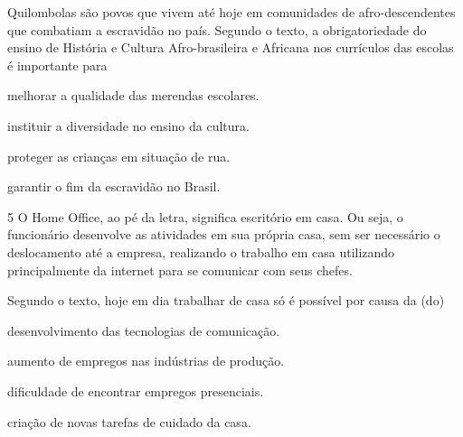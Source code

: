 
Quilombolas são povos que vivem até hoje em comunidades de
afro-descendentes que combatiam a escravidão no país. Segundo o texto, a
obrigatoriedade do ensino de História e Cultura Afro-brasileira e
Africana nos currículos das escolas é importante para

\begin{escolha}
\item melhorar a qualidade das merendas escolares.

\item instituir a diversidade no ensino da cultura.

\item proteger as crianças em situação de rua.

\item garantir o fim da escravidão no Brasil.
\end{escolha}


\num{5} O Home Office, ao pé da letra, significa escritório em casa. Ou seja, o
funcionário desenvolve as atividades em sua própria casa, sem ser
necessário o deslocamento até a empresa, realizando o trabalho em casa
utilizando principalmente da internet para se comunicar com seus chefes.


Segundo o texto, hoje em dia trabalhar de casa só é possível por causa
da (do)

\begin{escolha}
\item desenvolvimento das tecnologias de comunicação.

\item aumento de empregos nas indústrias de produção.

\item dificuldade de encontrar empregos presenciais.

\item criação de novas tarefas de cuidado da casa.
\end{escolha}

